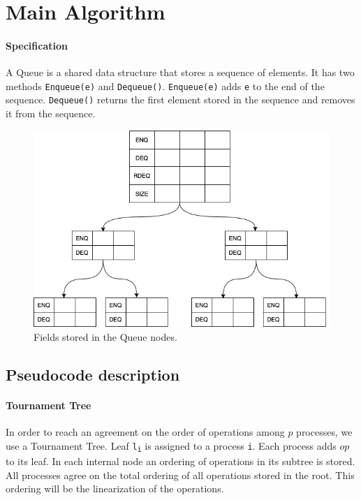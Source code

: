 \documentclass[10pt]{article}
\theoremstyle{definition}
\begin{document}
\pagebreak
\section{Main Algorithm}

\paragraph{Specification}
A Queue is a shared data structure that stores a sequence of elements. It has two methods \texttt{Enqueue(e)} and \texttt{Dequeue()}. \texttt{Enqueue(e)} adds \texttt{e} to the end of the sequence. \texttt{Dequeue()} returns the first element stored in the sequence and removes it from the sequence.

\begin{figure}[hbt]
\centering
  \includegraphics[width=5in]{pics/queue}
  \caption{Fields stored in the Queue nodes. \label{fig::queue}}
\end{figure}


\subsection{Pseudocode description}

\paragraph{Tournament Tree}
In order to reach an agreement on the order of operations among $p$ processes, we use a Tournament Tree. Leaf \texttt{l\textsubscript{i}} is assigned to a process \texttt{i}. Each process adds $op$ to its leaf. In each internal node an ordering of operations in its subtree is stored. All processes agree on the total ordering of all operations stored in the root. This ordering will be the linearization of the operations.
\end{document}
